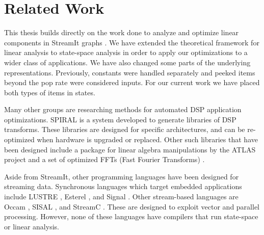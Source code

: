 \chapter{Related Work}

    This thesis builds directly on the work done to analyze and
optimize linear components in StreamIt graphs \cite{Lamb}. We have
extended the theoretical framework for linear analysis to
state-space analysis in order to apply our optimizations to a
wider class of applications. We have also changed some parts of
the underlying representations. Previously, constants were handled
separately and peeked items beyond the pop rate were considered
inputs. For our current work we have placed both types of items in
states.

    Many other groups are researching methods for automated DSP
application optimizations. SPIRAL \cite{Spiral} is a system
developed to generate libraries of DSP transforms. These libraries
are designed for specific architectures, and can be re-optimized
when hardware is upgraded or replaced. Other such libraries that
have been designed include a package for linear algebra
manipulations by the ATLAS project \cite{Atlas} and a set of
optimized FFTs (Fast Fourier Transforms) \cite{fftw}.

    Aside from StreamIt, other programming languages have been
designed for streaming data. Synchronous languages which target
embedded applications include LUSTRE \cite{Lustre}, Esterel
\cite{Esterel}, and Signal \cite{Signal}. Other stream-based
languages are Occam \cite{Occam}, SISAL \cite{sisal}, and StreamC
\cite{streamc}. These are designed to exploit vector and parallel
processing. However, none of these languages have compilers that
run state-space or linear analysis.

